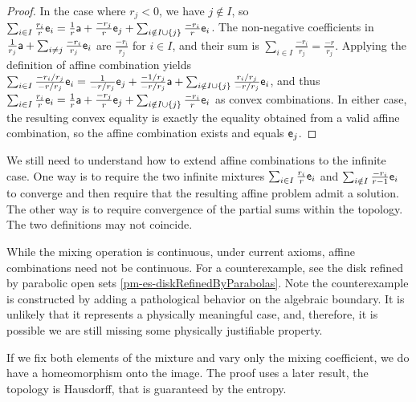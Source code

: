 \begin{mathSection}
\begin{proof}
	In the case where $r_j < 0$, we have $j \notin I$, so $\sum_{i \in I}\frac{r_i}{r}\ens[e]_i = \frac{1}{r}\ens[a] + \frac{-r_j}{r}\ens[e]_j + \sum_{i \notin I \cup \{j\}}\frac{-r_i}{r}\ens[e]_i$. The non-negative coefficients in $\frac{1}{r_j}\ens[a] + \sum_{i \ne j} \frac{-r_i}{r_j}\ens[e]_i$ are $\frac{-r_i}{r_j}$ for $i \in I$, and their sum is $\sum_{i \in I} \frac{-r_i}{r_j} = \frac{-r}{r_j}$. Applying the definition of affine combination yields $\sum_{i \in I} \frac{-r_i / r_j}{-r / r_j}\ens[e]_i = \frac{1}{-r / r_j}\ens[e]_j + \frac{-1 / r_j}{-r / r_j}\ens[a] + \sum_{i \notin I \cup \{j\}} \frac{r_i / r_j}{-r / r_j}\ens[e]_i$, and thus $\sum_{i \in I} \frac{r_i}{r}\ens[e]_i = \frac{1}{r}\ens[a] + \frac{-r_j}{r}\ens[e]_j + \sum_{i \notin I \cup \{j\}} \frac{-r_i}{r}\ens[e]_i$ as convex combinations. In either case, the resulting convex equality is exactly the equality obtained from a valid affine combination, so the affine combination exists and equals $\ens[e]_j$.
\end{proof}
\end{mathSection}

We still need to understand how to extend affine combinations to the infinite case. One way is to require the two infinite mixtures $\sum_{i \in I} \frac{r_i}{r} \ens_i$ and $\sum_{i \notin I} \frac{-r_i}{r-1} \ens_i$ to converge and then require that the resulting affine problem admit a solution. The other way is to require convergence of the partial sums within the topology. The two definitions may not coincide.

While the mixing operation is continuous, under current axioms, affine combinations need not be continuous. For a counterexample, see the disk refined by parabolic open sets \ref{pm-es-diskRefinedByParabolas}. Note the counterexample is constructed by adding a pathological behavior on the algebraic boundary. It is unlikely that it represents a physically meaningful case, and, therefore, it is possible we are still missing some physically justifiable property.

If we fix both elements of the mixture and vary only the mixing coefficient, we do have a homeomorphism onto the image. The proof uses a later result, the topology is Hausdorff, that is guaranteed by the entropy.

